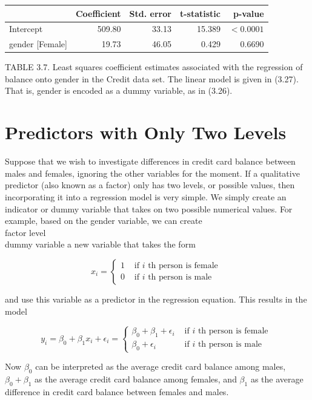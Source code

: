 \documentclass[10pt]{article}
\begin{document}
\begin{center}
\begin{tabular}{l|rrrr}
\hline
 & Coefficient & Std. error & t-statistic & p-value \\
\hline
Intercept & 509.80 & 33.13 & 15.389 & $<0.0001$ \\
gender [Female] & 19.73 & 46.05 & 0.429 & 0.6690 \\
\hline
\end{tabular}
\end{center}

TABLE 3.7. Least squares coefficient estimates associated with the regression of balance onto gender in the Credit data set. The linear model is given in (3.27). That is, gender is encoded as a dummy variable, as in (3.26).

\section*{Predictors with Only Two Levels}
Suppose that we wish to investigate differences in credit card balance between males and females, ignoring the other variables for the moment. If a qualitative predictor (also known as a factor) only has two levels, or possible values, then incorporating it into a regression model is very simple. We simply create an indicator or dummy variable that takes on two possible numerical values. For example, based on the gender variable, we can create\\
factor level\\
dummy variable a new variable that takes the form

\[
x_{i}= \begin{cases}1 & \text { if } i \text { th person is female }  \tag{3.26}\\ 0 & \text { if } i \text { th person is male }\end{cases}
\]

and use this variable as a predictor in the regression equation. This results in the model

\[
y_{i}=\beta_{0}+\beta_{1} x_{i}+\epsilon_{i}= \begin{cases}\beta_{0}+\beta_{1}+\epsilon_{i} & \text { if } i \text { th person is female }  \tag{3.27}\\ \beta_{0}+\epsilon_{i} & \text { if } i \text { th person is male }\end{cases}
\]

Now $\beta_{0}$ can be interpreted as the average credit card balance among males, $\beta_{0}+\beta_{1}$ as the average credit card balance among females, and $\beta_{1}$ as the average difference in credit card balance between females and males.
\end{document}
